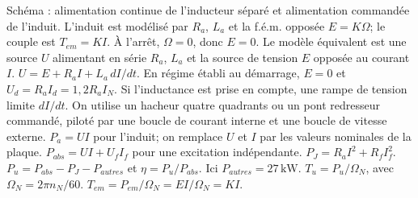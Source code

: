 \begin{corrigebox}
Schéma : alimentation continue de l'inducteur séparé et alimentation
            commandée de l'induit. L'induit est modélisé par $R_a$, $L_a$ et la f.é.m.
            opposée $E=K\Omega$; le couple est $T_{em}=KI$.
À l'arrêt, $\Omega=0$, donc $\boxed{E=0}$.
Le modèle équivalent est une source $U$ alimentant en série $R_a$, $L_a$
            et la source de tension $E$ opposée au courant $I$.
$U=E+R_aI+L_a\,dI/dt$. En régime établi au démarrage, $E=0$ et
            $U_d=R_aI_d=\boxed{1,2R_aI_N}$. Si l'inductance est prise en compte, une rampe
            de tension limite $dI/dt$.
On utilise un hacheur quatre quadrants ou un pont redresseur commandé,
            piloté par une boucle de courant interne et une boucle de vitesse externe.
$P_a=UI$ pour l'induit; on remplace $U$ et $I$ par les valeurs nominales
            de la plaque.
$P_{abs}=UI+U_fI_f$ pour une excitation indépendante.
$P_J=R_aI^2+R_fI_f^2$.
$P_u=P_{abs}-P_J-P_{autres}$ et
            $\eta=P_u/P_{abs}$. Ici $P_{autres}=27\,\mathrm{kW}$.
$T_u=P_u/\Omega_N$, avec $\Omega_N=2\pi n_N/60$.
            $T_{em}=P_{em}/\Omega_N=EI/\Omega_N=KI$.
\end{corrigebox}
